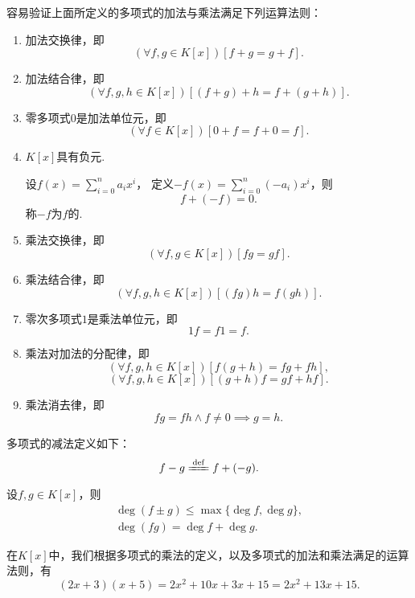 容易验证上面所定义的多项式的加法与乘法满足下列运算法则：
\begin{enumerate}
	\item 加法交换律，即\[
		(\forall f,g \in K[x])[f+g=g+f].
	\]

	\item 加法结合律，即\[
		(\forall f,g,h \in K[x])[(f+g)+h=f+(g+h)].
	\]

	\item 零多项式\(0\)是加法单位元，即\[
		(\forall f \in K[x])[0+f=f+0=f].
	\]

	\item \(K[x]\)具有负元.

	设\(f(x)=\sum_{i=0}^n a_i x^i\)，
	定义\(-f(x)=\sum_{i=0}^n (-a_i) x^i\)，则\[
		f+(-f)=0.
	\]
	称\(-f\)为\(f\)的.

	\item 乘法交换律，即\[
		(\forall f,g \in K[x])[fg=gf].
	\]

	\item 乘法结合律，即\[
		(\forall f,g,h \in K[x])[(fg)h=f(gh)].
	\]

	\item 零次多项式\(1\)是乘法单位元，即\[
		1f=f1=f.
	\]

	\item 乘法对加法的分配律，即\[
		(\forall f,g,h \in K[x])[f(g+h)=fg+fh],
	\]\[
		(\forall f,g,h \in K[x])[(g+h)f=gf+hf].
	\]

	\item 乘法消去律，即\[
		fg=fh \land f\neq0 \implies g=h.
	\]
\end{enumerate}

多项式的减法定义如下：\begin{equation}
	f-g \defeq f+(-g).
\end{equation}

\begin{proposition}
设\(f,g \in K[x]\)，则\begin{gather}
	\deg(f \pm g) \leq \max\{\deg f, \deg g\}, \\
	\deg(fg) = \deg f + \deg g.
\end{gather}
\end{proposition}

在\(K[x]\)中，我们根据多项式的乘法的定义，以及多项式的加法和乘法满足的运算法则，有
\begin{equation}\label{equation-example:多项式.示例公式1}
	(2x+3)(x+5)
	=2x^2+10x+3x+15
	=2x^2+13x+15.
\end{equation}

